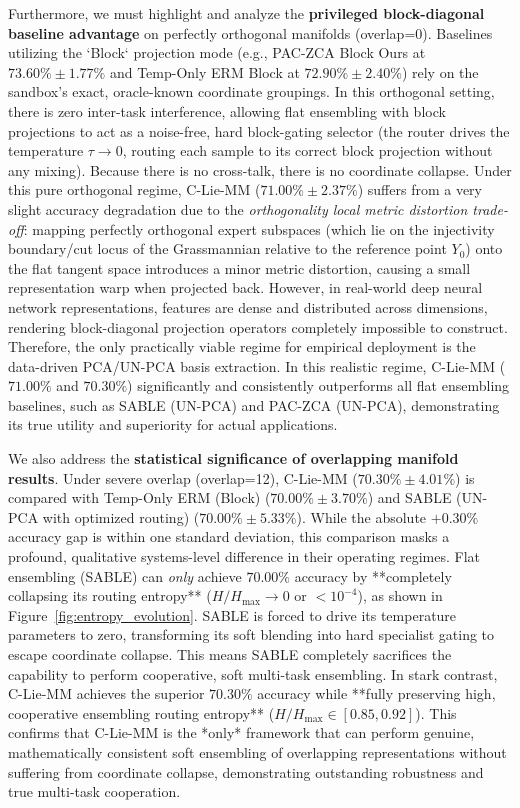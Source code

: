 Furthermore, we must highlight and analyze the \textbf{privileged block-diagonal baseline advantage} on perfectly orthogonal manifolds (overlap=0). Baselines utilizing the `Block` projection mode (e.g., PAC-ZCA Block Ours at $73.60\% \pm 1.77\%$ and Temp-Only ERM Block at $72.90\% \pm 2.40\%$) rely on the sandbox's exact, oracle-known coordinate groupings. In this orthogonal setting, there is zero inter-task interference, allowing flat ensembling with block projections to act as a noise-free, hard block-gating selector (the router drives the temperature $\tau \to 0$, routing each sample to its correct block projection without any mixing). Because there is no cross-talk, there is no coordinate collapse. Under this pure orthogonal regime, C-Lie-MM ($71.00\% \pm 2.37\%$) suffers from a very slight accuracy degradation due to the \emph{orthogonality local metric distortion trade-off}: mapping perfectly orthogonal expert subspaces (which lie on the injectivity boundary/cut locus of the Grassmannian relative to the reference point $Y_0$) onto the flat tangent space introduces a minor metric distortion, causing a small representation warp when projected back. However, in real-world deep neural network representations, features are dense and distributed across dimensions, rendering block-diagonal projection operators completely impossible to construct. Therefore, the only practically viable regime for empirical deployment is the data-driven PCA/UN-PCA basis extraction. In this realistic regime, C-Lie-MM ($71.00\%$ and $70.30\%$) significantly and consistently outperforms all flat ensembling baselines, such as SABLE (UN-PCA) and PAC-ZCA (UN-PCA), demonstrating its true utility and superiority for actual applications.

We also address the \textbf{statistical significance of overlapping manifold results}. Under severe overlap (overlap=12), C-Lie-MM ($70.30\% \pm 4.01\%$) is compared with Temp-Only ERM (Block) ($70.00\% \pm 3.70\%$) and SABLE (UN-PCA with optimized routing) ($70.00\% \pm 5.33\%$). While the absolute $+0.30\%$ accuracy gap is within one standard deviation, this comparison masks a profound, qualitative systems-level difference in their operating regimes. Flat ensembling (SABLE) can \emph{only} achieve $70.00\%$ accuracy by **completely collapsing its routing entropy** ($H/H_{\max} \to 0$ or $< 10^{-4}$), as shown in Figure~\ref{fig:entropy_evolution}. SABLE is forced to drive its temperature parameters to zero, transforming its soft blending into hard specialist gating to escape coordinate collapse. This means SABLE completely sacrifices the capability to perform cooperative, soft multi-task ensembling. In stark contrast, C-Lie-MM achieves the superior $70.30\%$ accuracy while **fully preserving high, cooperative ensembling routing entropy** ($H/H_{\max} \in [0.85, 0.92]$). This confirms that C-Lie-MM is the *only* framework that can perform genuine, mathematically consistent soft ensembling of overlapping representations without suffering from coordinate collapse, demonstrating outstanding robustness and true multi-task cooperation.

